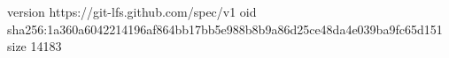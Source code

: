 version https://git-lfs.github.com/spec/v1
oid sha256:1a360a6042214196af864bb17bb5e988b8b9a86d25ce48da4e039ba9fc65d151
size 14183
